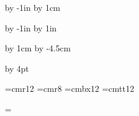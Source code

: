 



 
\nopagenumbers





\def\epsfsize#1#2{#1}




\iftrue %
{}
\hsize=210mm
\vsize=297mm
\fi


\iffalse
\special{papersize=297mm, 420mm}
\hsize=210mm
\vsize=297mm
\fi

\advance\voffset by -1in
\advance\voffset by 1cm

\advance\hoffset by -1in
\advance\hsize by 1in

\advance\hoffset by 1cm
\advance\hsize by -4.5cm

\advance\baselineskip by 4pt


\font\large=cmr12
\font\small=cmr8
\font\largebf=cmbx12
\font\largett=cmtt12




\headline={\hfil}

\parindent=0pt


\large


\baselineskip


\vfil\eject
            
\bye







\bye



